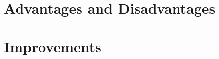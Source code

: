 \documentclass[]{article}
\begin{document}
\section{Advantages and Disadvantages}



\section{Improvements}


\clearpage


\end{document}
